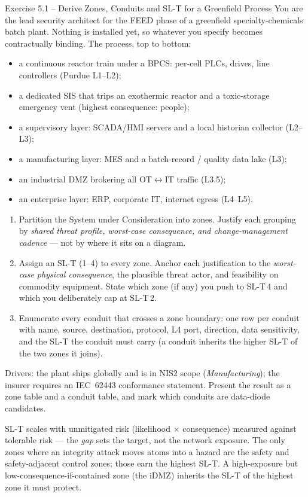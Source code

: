 \documentclass[11pt,a4paper]{article}
\begin{document}
\begin{taskbox}{Exercise 5.1 -- Derive Zones, Conduits and SL-T for a Greenfield Process}
You are the lead security architect for the FEED phase of a greenfield specialty-chemicals batch plant. Nothing is installed yet, so whatever you specify becomes contractually binding. The process, top to bottom:
\begin{itemize}\setlength{\itemsep}{1pt}
  \item a continuous reactor train under a BPCS: per-cell PLCs, drives, line controllers (Purdue L1--L2);
  \item a dedicated SIS that trips an exothermic reactor and a toxic-storage emergency vent (highest consequence: people);
  \item a supervisory layer: SCADA/HMI servers and a local historian collector (L2--L3);
  \item a manufacturing layer: MES and a batch-record / quality data lake (L3);
  \item an industrial DMZ brokering all OT$\leftrightarrow$IT traffic (L3.5);
  \item an enterprise layer: ERP, corporate IT, internet egress (L4--L5).
\end{itemize}
\begin{enumerate}
  \item Partition the System under Consideration into zones. Justify each grouping by \emph{shared threat profile, worst-case consequence, and change-management cadence} --- not by where it sits on a diagram.
  \item Assign an SL-T (1--4) to every zone. Anchor each justification to the \emph{worst-case physical consequence}, the plausible threat actor, and feasibility on commodity equipment. State which zone (if any) you push to SL-T\,4 and which you deliberately cap at SL-T\,2.
  \item Enumerate every conduit that crosses a zone boundary: one row per conduit with name, source, destination, protocol, L4 port, direction, data sensitivity, and the SL-T the conduit must carry (a conduit inherits the higher SL-T of the two zones it joins).
\end{enumerate}
Drivers: the plant ships globally and is in NIS2 scope (\emph{Manufacturing}); the insurer requires an IEC~62443 conformance statement. Present the result as a zone table and a conduit table, and mark which conduits are data-diode candidates.
\end{taskbox}

\begin{hintbox}
SL-T scales with unmitigated risk (likelihood $\times$ consequence) measured against tolerable risk --- the \emph{gap} sets the target, not the network exposure. The only zones where an integrity attack moves atoms into a hazard are the safety and safety-adjacent control zones; those earn the highest SL-T. A high-exposure but low-consequence-if-contained zone (the iDMZ) inherits the SL-T of the highest zone it must protect.
\end{hintbox}
\end{document}
